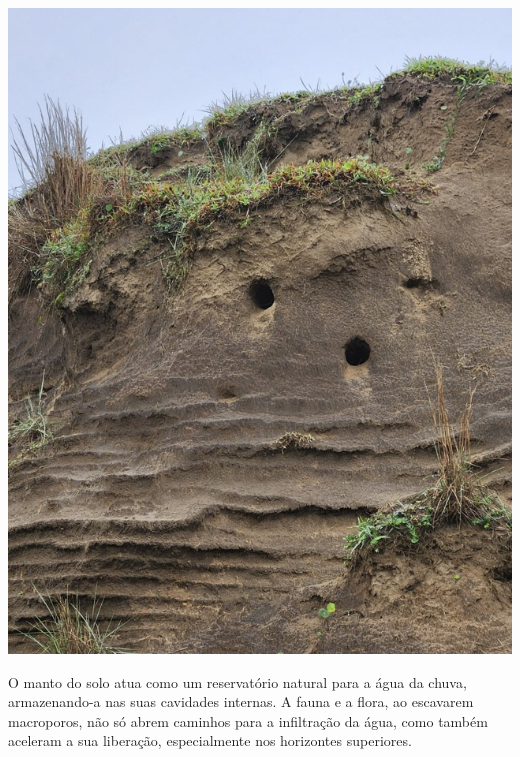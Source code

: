 \documentclass[./main.tex]{subfiles}
\begin{document}
\nolinenumbers

\newpage
\renewcommand{\headrulewidth}{0pt}
\thispagestyle{fancy}
\fancyhf{} %
\fancyfoot{} %
\fancyfoot[C]{\thepage}

\par \hfill
\vspace{40mm}
\begin{adjustwidth}{45pt}{45pt}
\begin{center}
    \includegraphics[scale=0.7]{figs/fig_tucos.jpg}\\
\end{center}
\vspace{10mm}
\noindent \textsf{O manto do solo atua como um reservatório natural para a água da chuva, armazenando-a nas suas cavidades internas. A fauna e a flora, ao escavarem macroporos, não só abrem caminhos para a infiltração da água, como também aceleram a sua liberação, especialmente nos horizontes superiores.}
\end{adjustwidth}
\clearpage
\end{document}

